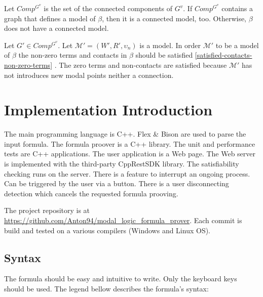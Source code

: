 \documentclass{article}
\newcommand\M{\mathcal{M}}
\begin{document}
		Let $Comp^{G^v}$ is the set of the connected components of $G^v$. If $Comp^{G^v}$ contains a graph that defines a model of $\beta$, then it is a connected model, too. Otherwise, $\beta$ does not have a connected model.

		Let $G' \in Comp^{G^v}$. Let $\M' = (W', R', \upsilon_n)$ is a model. In order $\M'$ to be a model of $\beta$ the non-zero terms and contacts in $\beta$ should be satisfied \ref{satisfied-contacts-non-zero-terms} . The zero terms and non-contacts are satisfied because $\M'$ has not introduces new modal points neither a connection.

	\newpage
	\section{Implementation Introduction}
	The main programming language is C++. Flex \& Bison are used to parse the input formula. The formula proover is a C++ library. The unit and performance tests are C++ applications.
	The user application is a Web page. The Web server is implemented with the third-party CppRestSDK library. The satisfiability checking runs on the server. There is a feature to interrupt an ongoing process. Can be triggered by the user via a button. There is a user disconnecting detection which cancels the requested formula prooving.

	The project repository is at \url{https://github.com/Anton94/modal_logic_formula_prover}. Each commit is build and tested on a various compilers (Windows and Linux OS).
		
	\subsection{Syntax}
	The formula should be easy and intuitive to write. Only the keyboard keys should be used. The legend bellow describes the formula's syntax:
\end{document}
